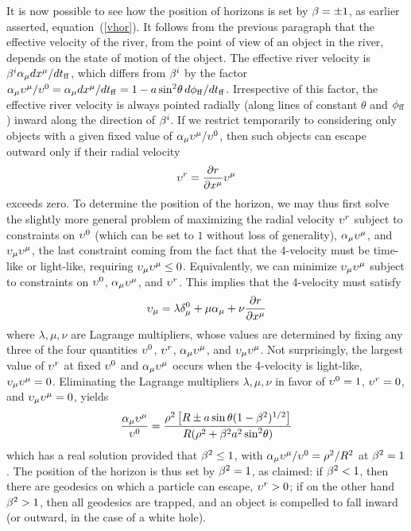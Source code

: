 \documentclass[twocolumn,showpacs,preprintnumbers,amsmath,amssymb,prb]{revtex4}
\begin{document}
It is now possible to see how the position of horizons
is set by $\beta = \pm 1$, as earlier asserted,
equation~(\ref{vhor}).
It follows from the previous paragraph
that the effective velocity of the river,
from the point of view of an object in the river,
depends on the state of motion of the object.
The effective river velocity is
$\beta^i \alpha_\mu d x^\mu / d t_{\rm ff}$,
which differs from $\beta^i$ by the factor
$\alpha_\mu \upsilon^\mu / \upsilon^0
= \alpha_\mu d x^\mu / d t_{\rm ff}
= 1 - a \sin^2\!\theta \, d\phi_{\rm ff} / d t_{\rm ff}$.
Irrespective of this factor,
the effective river velocity is always pointed radially
(along lines of constant $\theta$ and $\phi_{\rm ff}$)
inward along the direction of $\beta^i$.
If we restrict temporarily to considering
only objects with a given fixed value of
$\alpha_\mu \upsilon^\mu / \upsilon^0$,
then such objects can escape outward only if their radial velocity
\begin{equation}
  \upsilon^r = {\partial r \over \partial x^\mu} \upsilon^\mu
\end{equation}
exceeds zero.
To determine the position of the horizon,
we may thus first solve the slightly more general problem
of maximizing the radial velocity $\upsilon^r$
subject to constraints on $\upsilon^0$
(which can be set to $1$ without loss of generality),
$\alpha_\mu \upsilon^\mu$,
and $\upsilon_\mu \upsilon^\mu$,
the last constraint coming from the fact
that the 4-velocity must be time-like or light-like,
requiring $\upsilon_\mu \upsilon^\mu \leq 0$.
Equivalently,
we can minimize
$\upsilon_\mu \upsilon^\mu$
subject to constraints on $\upsilon^0$, $\alpha_\mu \upsilon^\mu$,
and $\upsilon^r$.
This implies that the 4-velocity must satisfy
\begin{equation}
  \upsilon_\mu
  =
  \lambda \delta^0_\mu + \mu \alpha_\mu + \nu {\partial r \over \partial x^\mu}
\end{equation}
where $\lambda,\mu,\nu$ are Lagrange multipliers,
whose values are determined by fixing any three of the four quantities
$\upsilon^0$, $\upsilon^r$, $\alpha_\mu \upsilon^\mu$,
and $\upsilon_\mu \upsilon^\mu$.
Not surprisingly,
the largest value of $\upsilon^r$ at fixed $\upsilon^0$
and $\alpha_\mu \upsilon^\mu$
occurs when the 4-velocity is light-like, $\upsilon_\mu \upsilon^\mu = 0$.
Eliminating the Lagrange multipliers $\lambda,\mu,\nu$
in favor of
$\upsilon^0 = 1$, $\upsilon^r = 0$, and $\upsilon_\mu \upsilon^\mu = 0$,
yields
\begin{equation}
  {\alpha_\mu \upsilon^\mu \over \upsilon^0}
  =
  {\rho^2 \left[ R \pm a \sin\theta (1 - \beta^2)^{1/2} \right]
  \over R ( \rho^2 + \beta^2 a^2 \sin^2\!\theta )}
\end{equation}
which has a real solution provided that $\beta^2 \leq 1$,
with $\alpha_\mu \upsilon^\mu / \upsilon^0 = \rho^2 / R^2$ at $\beta^2 = 1$.
The position of the horizon is thus set by $\beta^2 = 1$, as claimed:
if $\beta^2 < 1$, then there are geodesics on which a particle can escape,
$\upsilon^r > 0$;
if on the other hand $\beta^2 > 1$, then all geodesics are trapped,
and an object is compelled to fall inward
(or outward, in the case of a white hole).
\end{document}
